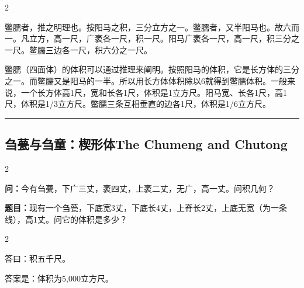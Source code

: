 \documentclass[11pt,a4paper]{article}
\newcommand{\longline}{\noindent\rule{\textwidth}{0.4pt}}
\newcommand{\bilingualsubsection}[2]{%
  \subsection{#1\hfill\normalfont\normalsize\color{sectioncolor}#2}%
}
\begin{document}
\vspace{0.2cm}

\begin{paracol}{2}

\begin{commentarybox}
鳖臑者，推之明理也。按阳马之积，三分立方之一。鳖臑者，又半阳马也。故六而一。凡立方，高一尺，广袤各一尺，积一尺。阳马广袤各一尺，高一尺，积三分之一尺。鳖臑三边各一尺，积六分之一尺。
\end{commentarybox}

\switchcolumn

\begin{commentarybox}
鳖臑（四面体）的体积可以通过推理来阐明。按照阳马的体积，它是长方体的三分之一。而鳖臑又是阳马的一半。所以用长方体体积除以6就得到鳖臑体积。一般来说，一个长方体高1尺，宽和长各1尺，体积是1立方尺。阳马宽、长各1尺，高1尺，体积是1/3立方尺。鳖臑三条互相垂直的边各1尺，体积是1/6立方尺。
\end{commentarybox}

\end{paracol}

\vspace{0.5cm}
\longline
\vspace{0.3cm}

\bilingualsubsection{刍甍与刍童：楔形体}{The Chumeng and Chutong}

\begin{paracol}{2}

\begin{problembox}[\CJKfamily{rm}刍甍 · 原文]
\textbf{问：}今有刍甍，下广三丈，袤四丈，上袤二丈，无广，高一丈。问积几何？
\end{problembox}

\switchcolumn

\begin{problembox}
\textbf{题目：}现有一个刍甍，下底宽3丈，下底长4丈，上脊长2丈，上底无宽（为一条线），高1丈。问它的体积是多少？
\end{problembox}

\end{paracol}

\vspace{0.2cm}

\begin{paracol}{2}

\begin{answerbox}[\CJKfamily{rm}答 · 原文]
答曰：积五千尺。
\end{answerbox}

\switchcolumn

\begin{answerbox}[白话文：答案]
答案是：体积为5,000立方尺。
\end{answerbox}

\end{paracol}
\end{document}

